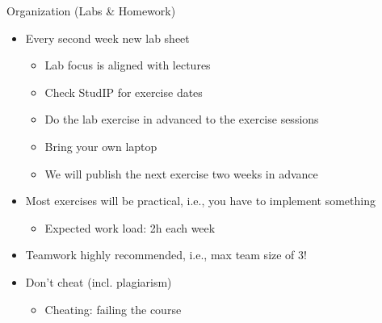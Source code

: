 \documentclass[aspectratio=169,handout]{../latex_main/tntbeamer}  %
\begin{document}
\begin{frame}[c]{Organization (Labs \& Homework)}

\vspace{-1em}
\begin{itemize}
  \item Every \alert{second} week new lab sheet
  \begin{itemize}
      \item Lab focus is aligned with lectures
      \item Check StudIP for exercise dates
      \item Do the lab exercise in advanced to the exercise sessions
      \item Bring your own laptop
      \item We will publish the next exercise two weeks in advance
  \end{itemize}
  \item Most exercises will be practical, i.e., you have to implement something
  \begin{itemize}
    \item Expected work load: 2h each week
  \end{itemize}
  \item Teamwork highly recommended, i.e., max team size of 3!
  \pause
  \pause
  \item Don't cheat (incl. plagiarism)
  \begin{itemize}
    \item Cheating: failing the course
  \end{itemize}
\end{itemize}

\end{frame}
\end{document}
